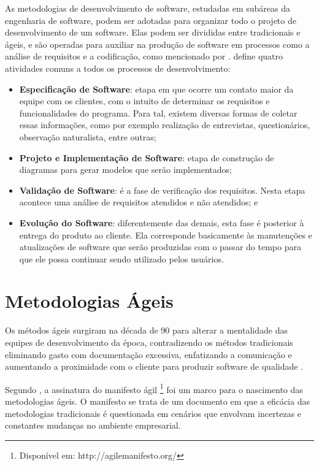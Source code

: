 As metodologias de desenvolvimento de software, estudadas em subáreas da engenharia de software, podem ser adotadas para organizar todo o projeto de desenvolvimento de um software. Elas podem ser divididas entre tradicionais e ágeis, e são operadas para auxiliar na produção de software em processos como a análise de requisitos e a codificação, como mencionado por .  define quatro atividades comuns a todos os processos de desenvolvimento:

\begin{itemize}
 \item \textbf{Especificação de Software}: etapa em que ocorre um contato maior da equipe com os clientes, com o intuito de determinar os requisitos e funcionalidades do programa. Para tal, existem diversas formas de coletar essas informações, como por exemplo realização de entrevistas, questionários, observação naturalista, entre outras;
 \item \textbf{Projeto e Implementação de Software}: etapa de construção de diagramas para gerar modelos que serão implementados;
 \item \textbf{Validação de Software}: é a fase de verificação dos requisitos. Nesta etapa acontece uma análise de requisitos atendidos e não atendidos; e
 \item \textbf{Evolução do Software}: diferentemente das demais, esta fase é posterior à entrega do produto ao cliente. Ela corresponde basicamente às manutenções e atualizações de software que serão produzidas com o passar do tempo para que ele possa continuar sendo utilizado pelos usuários.
\end{itemize}

\hspace{2.5cm}

\section{Metodologias Ágeis}
\label{sec:metodologiaagil}
\hspace{2.5cm}

Os métodos ágeis surgiram na década de 90 para alterar a mentalidade das equipes de desenvolvimento da época, contradizendo os métodos tradicionais eliminando gasto com documentação excessiva, enfatizando a comunicação e aumentando a proximidade com o cliente para produzir software de qualidade \cite{sato2007uso}.

Segundo , a assinatura do manifesto ágil \footnote{Disponível em: \textsf{http://agilemanifesto.org/}} foi um marco para o nascimento das metodologias ágeis. O manifesto se trata de um documento em que a eficácia das metodologias tradicionais é questionada em cenários que envolvam incertezas e constantes mudanças no ambiente empresarial. 

